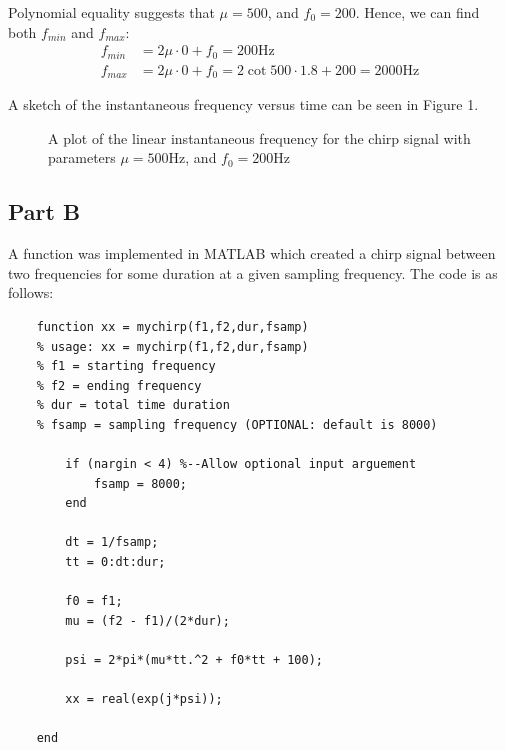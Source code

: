 \documentclass{article}
\begin{document}
Polynomial equality suggests that $\mu = 500$, and $f_0 = 200$. Hence, we can find both $f_{min}$ and $f_{max}$:
\begin{align}
	f_{min} &= 2 \mu \cdot 0 + f_0 = 200 \si{\hertz}\\
	f_{max} &= 2 \mu \cdot 0 + f_0 = 2 \cot 500 \cdot 1.8 + 200 = 2000 \si{\hertz}
\end{align}

A sketch of the instantaneous frequency versus time can be seen in Figure 1.
\begin{figure}[H]
	\centering
	\caption{A plot of the linear instantaneous frequency for the chirp signal with parameters $\mu = 500 \si{\hertz}$, and $f_0 = 200 \si{\hertz}$}
\end{figure}

\subsection{Part B}

A function was implemented in MATLAB which created a chirp signal between two frequencies for some duration at a given sampling frequency. The code is as follows:
\begin{lstlisting}
	function xx = mychirp(f1,f2,dur,fsamp)
	% usage: xx = mychirp(f1,f2,dur,fsamp)
	% f1 = starting frequency
	% f2 = ending frequency
	% dur = total time duration
	% fsamp = sampling frequency (OPTIONAL: default is 8000)
	
	    if (nargin < 4) %--Allow optional input arguement
	        fsamp = 8000;
	    end
	    
	    dt = 1/fsamp;
	    tt = 0:dt:dur;
	    
	    f0 = f1;
	    mu = (f2 - f1)/(2*dur);
	    
	    psi = 2*pi*(mu*tt.^2 + f0*tt + 100);
	    
	    xx = real(exp(j*psi));
	    
	end
\end{lstlisting}
\end{document}
